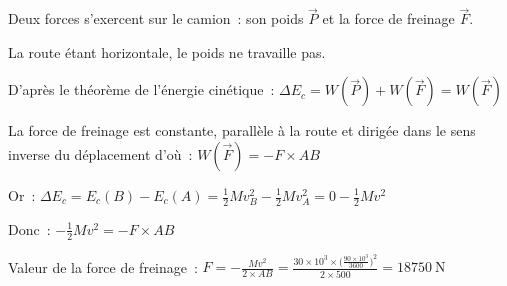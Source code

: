 Deux forces s'exercent sur le camion~: son poids $\vec{P}$ et la force de
freinage $\vec{F}$.

La route étant horizontale, le poids ne travaille pas.

D'après le théorème de l'énergie cinétique~:
$\Delta E_{c}=W(\vec{P})+W(\vec{F})=W(\vec{F})$

La force de freinage est constante, parallèle à la route et dirigée dans le sens
inverse du déplacement d'où~: ${W(\vec{F})=-F \times AB}$

Or~:
$\Delta E_{c}=E_{c}(B)-E_{c}(A)=\frac{1}{2}Mv_{B}^{2}-\frac{1}{2}Mv_{A}^{2}=
0-\frac{1}{2}Mv^{2}$

Donc~:
$-\frac{1}{2}Mv^{2}=-F \times AB$

Valeur de la force de freinage~:
$F=-\frac{Mv^{2}}{2\times AB}=
\frac{30\times 10^{3}\times\bigl(\frac{90\times 10^{3}}{3600}\bigr)^{2}}{2\times 500}=
\qty{18750}{\N}$\\



